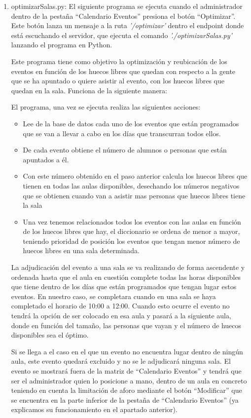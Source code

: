 \documentclass[a4paper, 12pt]{book}
\begin{document}
\begin{enumerate}
  	
  	\item optimizarSalas.py: El siguiente programa se ejecuta cuando el administrador dentro de la pestaña ``Calendario Eventos'' presiona el botón ``Optimizar''. Este botón lanza un mensaje a la ruta \textit{'/optimizar'} dentro el endpoint donde está escuchando el servidor, que ejecuta el comando \textit{'./optimizarSalas.py'} lanzando el programa en Python. 
  	
  	Este programa tiene como objetivo la optimización y reubicación de los eventos en función de los huecos libres que quedan con respecto a la gente que se ha apuntado o quiere asistir al evento, con los huecos libres que quedan en la sala. Funciona de la siguiente manera:
  	
  	El programa, una vez se ejecuta realiza las siguientes acciones:
  	\begin{itemize}
\item Lee de la base de datos cada uno de los eventos que están programados que se van a llevar a cabo en los días que transcurran todos ellos.
\item De cada evento obtiene el número de alumnos o personas que están apuntados a él.
\item Con este número obtenido en el paso anterior calcula los huecos libres que tienen en todas las aulas disponibles, desechando los números negativos que se obtienen cuando van a asistir mas personas que huecos libres tiene la sala
\item Una vez tenemos relacionados todos los eventos con las aulas en función de los huecos libres que hay, el diccionario se ordena de menor a mayor, teniendo prioridad de posición los eventos que tengan menor número de huecos libres en una sala determinada.
\end{itemize}
  	 
  	La adjudicación del evento a una sala se va realizando de forma ascendente y ordenada hasta que el aula en cuestión complete todas las horas disponibles que tiene dentro de los días que están programados que tengan lugar estos eventos. En nuestro caso, se completara cuando en una sala se haya completado el horario de 10:00 a 12:00. Cuando esto ocurre el evento no tendrá la opción de ser colocado en esa aula y pasará a la siguiente aula, donde en función del tamaño, las personas que vayan y el número de huecos disponibles sea el óptimo.
  	
  	Si se llega a el caso en el que un evento no encuentra lugar dentro de ningún aula, este evento quedará excluido y no se le adjudicará ninguna sala. El evento se mostrará fuera de la matriz de ``Calendario Eventos''  y tendrá que ser el administrador quien lo posicione a mano, dentro de un aula en concreto teniendo en cuenta la limitación de aforo mediante el botón ``Modificar'' que se encuentra en la parte inferior de la pestaña de ``Calendario Eventos'' (ya explicamos su funcionamiento en el apartado anterior).
	\end{enumerate}
\end{document}
